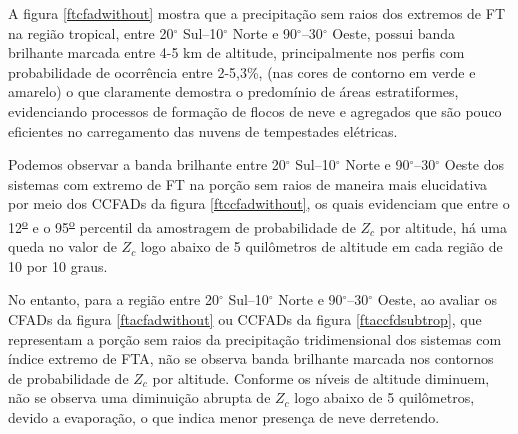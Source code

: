 


A figura \ref{ftcfadwithout} mostra que a precipitação sem raios dos extremos de FT na região tropical, entre 20$^{\circ}$ Sul--10$^{\circ}$ Norte e 90$^{\circ}$--30$^{\circ}$ Oeste, possui banda brilhante marcada entre 4-5 km de altitude, principalmente nos perfis com probabilidade de ocorrência entre 2-5,3\%, (nas cores de contorno em verde e amarelo) o que claramente demostra o predomínio de áreas estratiformes, evidenciando processos de formação de flocos de neve e agregados que são pouco eficientes no carregamento das nuvens de tempestades elétricas. 

Podemos observar a banda brilhante entre 20$^{\circ}$ Sul--10$^{\circ}$ Norte e 90$^{\circ}$--30$^{\circ}$ Oeste  dos sistemas com  extremo de FT na porção sem raios de maneira mais elucidativa por meio dos CCFADs da figura \ref{ftccfadwithout}, os quais evidenciam que entre o 12\textsuperscript{\underline{o}} e o 95\textsuperscript{\underline{o}} percentil da amostragem de probabilidade de $Z_c$ por altitude, há uma queda no valor de $Z_c$ logo abaixo de 5 quilômetros de altitude em cada região de 10 por 10 graus. 

No entanto, para a região entre 20$^{\circ}$ Sul--10$^{\circ}$ Norte e 90$^{\circ}$--30$^{\circ}$ Oeste, ao avaliar os CFADs da figura \ref{ftacfadwithout} ou CCFADs da figura \ref{ftaccfdsubtrop}, que representam a porção sem raios da precipitação tridimensional dos sistemas com índice extremo de FTA, não se observa banda brilhante marcada nos contornos de probabilidade de $Z_c$ por altitude. Conforme os níveis de altitude diminuem, não se observa uma diminuição abrupta de $Z_c$ logo abaixo de 5 quilômetros, devido a evaporação, o que indica menor presença de neve derretendo.

